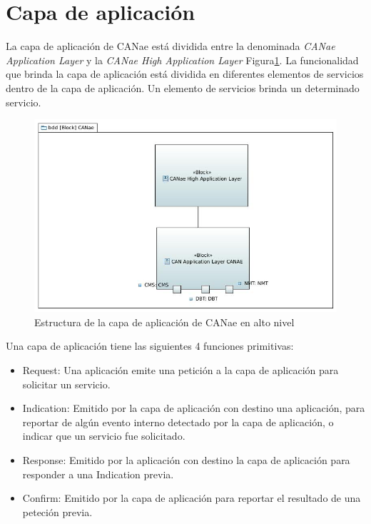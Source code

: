 \section{Capa de aplicación}
La capa de aplicación de CANae está dividida entre la denominada \textit{CANae Application Layer} y la \textit{CANae High Application Layer} Figura\ref{fig:CANAE}. La funcionalidad que brinda la capa de aplicación está dividida en diferentes elementos de servicios dentro de la capa de aplicación. Un elemento de servicios brinda un determinado servicio.

\begin{figure}[h!]
 \centering
 \includegraphics[scale=0.5]{images/Secciones/AppendixA/CANAE.JPG}
  \caption{Estructura de la capa de aplicación de CANae en alto nivel}
\label{fig:CANAE}
\end{figure}

Una capa de aplicación tiene las siguientes 4 funciones primitivas:
\begin{itemize}
\item Request: Una aplicación emite una petición a la capa de aplicación para solicitar un servicio.
  
\item Indication: Emitido por la capa de aplicación con destino una aplicación, para reportar de algún evento interno detectado por la capa de aplicación, o indicar que un servicio fue solicitado.

\item Response: Emitido por la aplicación con destino la capa de aplicación para responder a una Indication previa.

\item Confirm: Emitido por la capa de aplicación para reportar el resultado de una peteción previa. 
\end{itemize}

